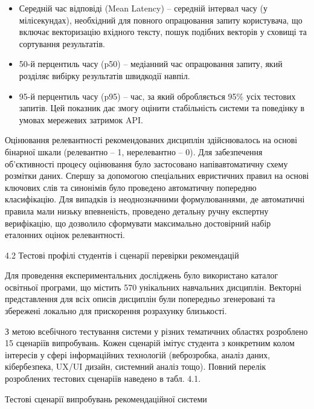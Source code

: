 \documentclass[
]{article}
\begin{document}
\begin{itemize}
\item
  Середній час відповіді (Mean Latency) -- середній інтервал часу (у
  мілісекундах), необхідний для повного опрацювання запиту користувача,
  що включає векторизацію вхідного тексту, пошук подібних векторів у
  сховищі та сортування результатів.
\item
  50-й перцентиль часу (p50) -- медіанний час опрацювання запиту, який
  розділяє вибірку результатів швидкодії навпіл.
\item
  95-й перцентиль часу (p95) -- час, за який обробляється 95\% усіх
  тестових запитів. Цей показник дає змогу оцінити стабільність системи
  та поведінку в умовах мережевих затримок API.
\end{itemize}

Оцінювання релевантності рекомендованих дисциплін здійснювалось на
основі бінарної шкали (релевантно -- 1, нерелевантно -- 0). Для
забезпечення об'єктивності процесу оцінювання було застосовано
напівавтоматичну схему розмітки даних. Спершу за допомогою спеціальних
евристичних правил на основі ключових слів та синонімів було проведено
автоматичну попередню класифікацію. Для випадків із неоднозначними
формулюваннями, де автоматичні правила мали низьку впевненість,
проведено детальну ручну експертну верифікацію, що дозволило сформувати
максимально достовірний набір еталонних оцінок релевантності.

\protect{}\label{ux442ux435ux441ux442ux43eux432ux456-ux434ux430ux43dux456-ux442ux430-ux441ux446ux435ux43dux430ux440ux456ux457-ux432ux438ux43fux440ux43eux431ux443ux432ux430ux43dux44c}{}4.2
Тестові профілі студентів і сценарії перевірки рекомендацій

Для проведення експериментальних досліджень було використано каталог
освітньої програми, що містить 570 унікальних навчальних дисциплін.
Векторні представлення для всіх описів дисциплін були попередньо
згенеровані та збережені локально для прискорення розрахунку близькості.

З метою всебічного тестування системи у різних тематичних областях
розроблено 15 сценаріїв випробувань. Кожен сценарій імітує студента з
конкретним колом інтересів у сфері інформаційних технологій
(веброзробка, аналіз даних, кібербезпека, UX/UI дизайн, системний аналіз
тощо). Повний перелік розроблених тестових сценаріїв наведено в табл.
4.1.

Тестові сценарії випробувань рекомендаційної системи
\end{document}
